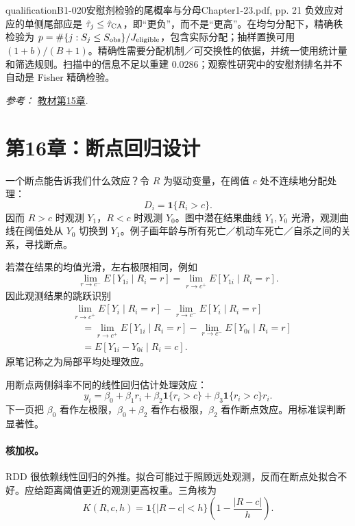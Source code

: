{\begin{reviewnote}{qualification}{B1-020}{安慰剂检验的尾概率与分母}{Chapter1-23.pdf, pp. 21}
负效应对应的单侧尾部应是 $\hat\tau_j\le\hat\tau_{\rm CA}$，即“更负”，而不是“更高”。在均匀分配下，精确秩检验为 $p=\#\{j:S_j\le S_{\rm obs}\}/J_{\rm eligible}$，包含实际分配；抽样置换可用 $(1+b)/(B+1)$。精确性需要分配机制／可交换性的依据，并统一使用统计量和筛选规则。扫描中的信息不足以重建 $0.0286$；观察性研究中的安慰剂排名并不自动是 Fisher 精确检验。
\par\smallskip\textit{参考：} \href{https://matheusfacure.github.io/python-causality-handbook/15-Synthetic-Control.html}{教材第15章}.
\end{reviewnote}
\section{第16章：断点回归设计}
一个断点能告诉我们什么效应？令 $R$ 为驱动变量，在阈值 $c$ 处不连续地分配处理：
\[D_i=\mathbf1\{R_i>c\}.\]
 因而 $R>c$ 时观测 $Y_1$，$R<c$ 时观测 $Y_0$。图中潜在结果曲线 $Y_1,Y_0$ 光滑，观测曲线在阈值处从 $Y_0$ 切换到 $Y_1$。例子画年龄与所有死亡／机动车死亡／自杀之间的关系，寻找断点。

若潜在结果的均值光滑，左右极限相同，例如
\[\lim_{r\to c^-}E[Y_{1i}\mid R_i=r]=\lim_{r\to c^+}E[Y_{1i}\mid R_i=r].\]
因此观测结果的跳跃识别
\begin{align*}
&\lim_{r\to c^+}E[Y_i\mid R_i=r]-\lim_{r\to c^-}E[Y_i\mid R_i=r]\\
&\quad=\lim_{r\to c^+}E[Y_{1i}\mid R_i=r]-\lim_{r\to c^-}E[Y_{0i}\mid R_i=r]\\
&\quad=E[Y_{1i}-Y_{0i}\mid R_i=c].
\end{align*}
原笔记称之为局部平均处理效应。

用断点两侧斜率不同的线性回归估计处理效应：
\[y_i=\beta_0+\beta_1r_i+\beta_2\mathbf1\{r_i>c\}+\beta_3\mathbf1\{r_i>c\}r_i.\]
 下一页把 $\beta_0$ 看作左极限，$\beta_0+\beta_2$ 看作右极限，$\beta_2$ 看作断点效应。用标准误判断显著性。

\paragraph{核加权。}
RDD 很依赖线性回归的外推。拟合可能过于照顾远处观测，反而在断点处拟合不好。应给距离阈值更近的观测更高权重。三角核为
\[K(R,c,h)=\mathbf1\{|R-c|<h\}\left(1-\frac{|R-c|}{h}\right).\]

}
